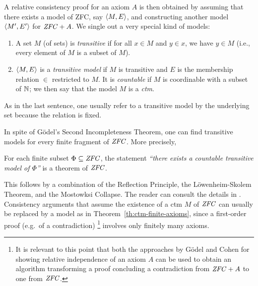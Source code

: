 A relative consistency proof for an axiom $A$ is then obtained by
assuming that there exists a model of ZFC, say $\langle M,E\rangle$, and
constructing another model $\langle M',E'\rangle$ for $\mathit{ZFC} + A$. We single
out a very special kind of models:
%
\begin{definition}\label{def:transitive-model}
  \begin{enumerate}
  \item A set $M$ (of sets) is \emph{transitive} if for all $x\in M$ and 
    $y\in x$, we have $y\in M$ (i.e., every element of $M$ is a subset
    of $M$).
  \item $\langle M,E\rangle$ is a \emph{transitive model} if $M$ is transitive
     and  $E$ is the membership relation $\in$ restricted to
    $M$. It is \emph{countable} if $M$ is coordinable with a subset of
    $\mathbb{N}$; we then say that the model  $M$ is a \emph{ctm}. 
  \end{enumerate}
\end{definition}
%
\noindent As in the last sentence, one usually refer to a transitive
model by the underlying set because the relation is fixed.

In spite of G\"odel's Second Incompleteness Theorem, one can find
transitive models for every finite fragment of $\mathit{ZFC}$. More precisely,
%
\begin{theorem}\label{th:ctm-finite-axioms}
  For each finite subset
  $\Phi\subseteq \mathit{ZFC}$, the statement \emph{``there exists a countable
    transitive model of $\Phi$''} is a theorem of $\mathit{ZFC}$.
\end{theorem}
%
This follows by a combination of the Reflection Principle, the
L\"owenheim-Skolem Theorem, and the Mostowksi Collapse. The reader can
consult the details in \cite{kunen2011set}. Consistency arguments that
assume the existence of a ctm $M$ of $\mathit{ZFC}$ can usually be replaced by
a model as in Theorem~\ref{th:ctm-finite-axioms}, since a first-order
proof (e.g.\ of a contradiction)%
\footnote{It is relevant to this point that 
  both the approaches by G\"odel and Cohen for showing
  relative independence of an axiom $A$ 
  can be used to obtain an algorithm transforming a proof
  concluding a contradiction from $\mathit{ZFC}+A$ to one from $\mathit{ZFC}$.}
involves only finitely many axioms.

